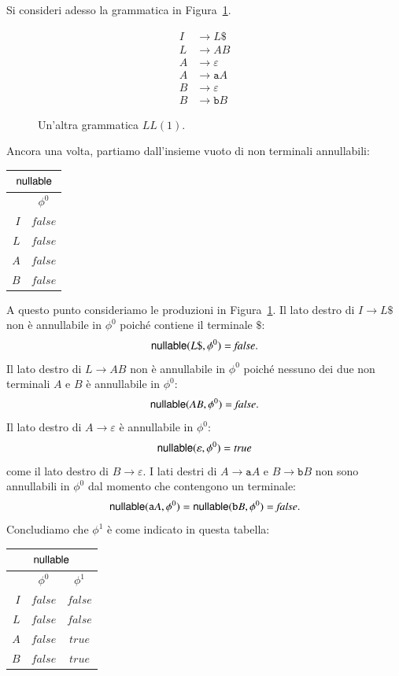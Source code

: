 Si consideri adesso la grammatica in Figura~\ref{fig:grammar_lists}.
%
\begin{figure}[t]
\begin{align*}
  I&\to L\mathtt{\$}\\
  L&\to AB\\
  A&\to\varepsilon\\
  A&\to\mathtt{a}A\\
  B&\to\varepsilon\\
  B&\to\mathtt{b}B
\end{align*}
\caption{Un'altra grammatica $\mathit{LL}(1)$.}\label{fig:grammar_lists}
\end{figure}
%
Ancora una volta, partiamo dall'insieme vuoto di non terminali annullabili:
%
\begin{center}
\begin{tabular}{|r||c|}
\multicolumn{2}{c}{$\mathsf{nullable}$}\\\hline\hline
 & $\phi^0$ \\\hline
$I$ & $\mathit{false}$ \\\hline
$L$ & $\mathit{false}$ \\\hline
$A$ & $\mathit{false}$ \\\hline
$B$ & $\mathit{false}$\\\hline
\end{tabular}
\end{center}
%
A questo punto consideriamo le produzioni in Figura~\ref{fig:grammar_lists}.
Il lato destro di $I\to L\mathtt{\$}$ non \`e annullabile in $\phi^0$ poich\'e
contiene il terminale $\mathtt{\$}$:
\[
  \mathsf{nullable}(L\mathtt{\$},\phi^0)=\mathit{false}.
\]
Il lato destro di $L\to AB$ non \`e annullabile in $\phi^0$ poich\'e
nessuno dei due non terminali $A$ e $B$ \`e annullabile in $\phi^0$:
\[
  \mathsf{nullable}(AB,\phi^0)=\mathit{false}.
\]
Il lato destro di $A\to\varepsilon$ \`e annullabile in $\phi^0$:
\[
  \mathsf{nullable}(\varepsilon,\phi^0)=\mathit{true}
\]
\cosi come il lato destro di $B\to\varepsilon$. I lati destri di
$A\to\mathtt{a}A$ e $B\to\mathtt{b}B$ non sono annullabili in $\phi^0$ dal
momento che contengono un terminale:
\[
  \mathsf{nullable}(\mathtt{a}A,\phi^0)=\mathsf{nullable}(\mathtt{b}B,\phi^0)=\mathit{false}.
\]
Concludiamo che $\phi^1$ \`e come indicato in questa tabella:
%
\begin{center}
\begin{tabular}{|r||c|c|}
\multicolumn{3}{c}{$\mathsf{nullable}$}\\\hline\hline
 & $\phi^0$ & $\phi^1$ \\\hline
$I$ & $\mathit{false}$ & $\mathit{false}$ \\\hline
$L$ & $\mathit{false}$ & $\mathit{false}$ \\\hline
$A$ & $\mathit{false}$ & $\mathit{true}$ \\\hline
$B$ & $\mathit{false}$ & $\mathit{true}$ \\\hline
\end{tabular}
\end{center}

